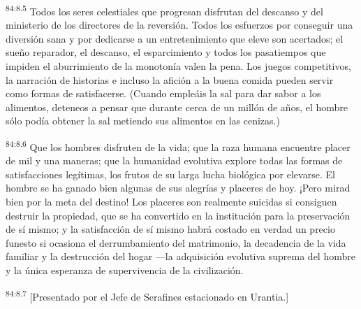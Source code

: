 \par
\textsuperscript{84:8.5} Todos los seres celestiales que progresan disfrutan del descanso y del ministerio de los directores de la reversión. Todos los esfuerzos por conseguir una diversión sana y por dedicarse a un entretenimiento que eleve son acertados; el sueño reparador, el descanso, el esparcimiento y todos los pasatiempos que impiden el aburrimiento de la monotonía valen la pena. Los juegos competitivos, la narración de historias e incluso la afición a la buena comida pueden servir como formas de satisfacerse. (Cuando empleáis la sal para dar sabor a los alimentos, deteneos a pensar que durante cerca de un millón de años, el hombre sólo podía obtener la sal metiendo sus alimentos en las cenizas.)

\par
\textsuperscript{84:8.6} Que los hombres disfruten de la vida; que la raza humana encuentre placer de mil y una maneras; que la humanidad evolutiva explore todas las formas de satisfacciones legítimas, los frutos de su larga lucha biológica por elevarse. El hombre se ha ganado bien algunas de sus alegrías y placeres de hoy. ¡Pero mirad bien por la meta del destino! Los placeres son realmente suicidas si consiguen destruir la propiedad, que se ha convertido en la institución para la preservación de sí mismo; y la satisfacción de sí mismo habrá costado en verdad un precio funesto si ocasiona el derrumbamiento del matrimonio, la decadencia de la vida familiar y la destrucción del hogar ---la adquisición evolutiva suprema del hombre y la única esperanza de supervivencia de la civilización.

\par
\textsuperscript{84:8.7} [Presentado por el Jefe de Serafines estacionado en Urantia.]